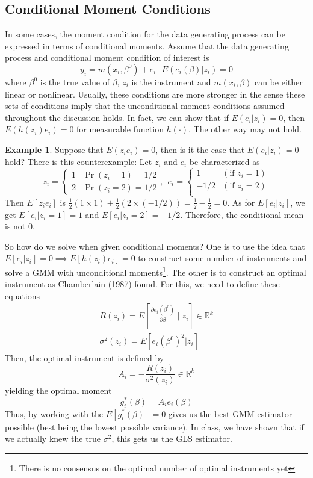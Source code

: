 \documentclass[12pt]{article}
\theoremstyle{definition}
\theoremstyle{property}
\theoremstyle{assumption}
\theoremstyle{example}
\newtheorem{example}{Example}[section]
\theoremstyle{comment}
\begin{document}
\subsection{Conditional Moment Conditions}
In some cases, the moment condition for the data generating process can be expressed in terms of conditional moments. Assume that the data generating process and conditional moment condition of interest is
\[ 
y_i =m( x_i,\beta^0 )+ e_i \ \ \ E(e_i(\beta)|z_i)=0
\]
where $\beta^0$ is the true value of $\beta$, $z_i$ is the instrument and $m(x_i,\beta)$ can be either linear or nonlinear. Usually, these conditions are more stronger in the sense these sets of conditions imply that the unconditional moment conditions assumed throughout the discussion holds. In fact, we can show that if $E(e_i|z_i)=0$, then $E(h(z_i)e_i)=0$ for measurable function $h(\cdot)$. The other way may not hold.
\begin{mdframed}[backgroundcolor=yellow!5] 
\begin{example} Suppose that $E(z_ie_i)=0$, then is it the case that $E(e_i|z_i)=0$ hold? There is this counterexample: Let $z_i$ and $e_i$ be characterized as
\[
z_i=\begin{cases} 1 & \Pr(z_i=1)=1/2 \\ 2 & \Pr(z_i=2)=1/2 \end{cases}, \ \  e_i = \begin{cases} 1 & (\text{if }z_i=1)\\ -1/2 & (\text{if }z_i=2)\\\end{cases}
\]
Then $E[z_ie_i]$  is $\frac{1}{2}(1\times 1) +  \frac{1}{2}(2\times (-1/2))= \frac{1}{2}-\frac{1}{2}=0$. As for $E[e_i|z_i]$, we get $E[e_i|z_i=1]=1$ and $E[e_i|z_i=2]=-1/2$. Therefore, the conditional mean is not 0. 
\end{example}
\end{mdframed} \par
So how do we solve when given conditional moments? One is to use the idea that $E[e_i|z_i]=0\implies E[h(z_i)e_i]=0$ to construct some number of instruments and solve a GMM with unconditional moments\footnote{There is no consensus on the optimal number of optimal instruments yet}.  The other is to construct an optimal instrument as Chamberlain (1987) found. For this, we need to define these equations
\begin{gather*}
R(z_i) = E\left[\frac{\partial e_i(\beta^0)}{\partial \beta}\mid z_i\right] \in\mathbb{R}^k \\
\sigma^2(z_i) = E[e_i(\beta^0)^2|z_i]
\end{gather*}
Then, the optimal instrument is defined by
\[
A_i = -\frac{R(z_i)}{\sigma^2(z_i)}\in\mathbb{R}^k
\]
yielding the optimal moment
\[
g^*_i(\beta) = A_i e_i(\beta)
\]
Thus, by working with the $E[g^*_i(\beta)]=0$ gives us the best GMM estimator possible (best being the lowest possible variance). In class, we have shown that if we actually knew the true $\sigma^2$, this gets us the GLS estimator.
\end{document}
